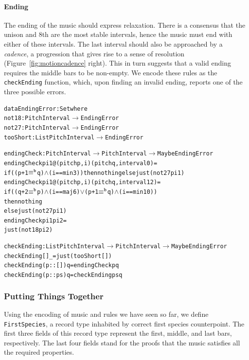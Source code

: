 \paragraph{Ending}

The ending of the music should express relaxation.
There is a consensus that the unison and 8th are the most stable
intervals, hence the music must end with either of these intervals.
The last interval should also be approached by a \emph{cadence},
a progression that gives rise to a sense of resolution
(Figure~\ref{fig:motioncadence} right).
This in turn suggests that a valid ending requires the middle bars
to be non-empty.
We encode these rules as the \texttt{checkEnding} function, which,
upon finding an invalid ending, reports one of the three possible
errors.

\begin{alltt}
data EndingError : Set where
  not18    : PitchInterval      \(\rightarrow\) EndingError
  not27    : PitchInterval      \(\rightarrow\) EndingError
  tooShort : List PitchInterval \(\rightarrow\) EndingError

endingCheck : PitchInterval \(\rightarrow\) PitchInterval \(\rightarrow\) Maybe EndingError
endingCheck pi1@(pitch p , i) (pitch q , interval 0)  = 
  if ((p + 1 \(\equiv\sp{\mathtt{b}}\) q) \(\wedge\) (i == min3)) then nothing else just (not27 pi1)
endingCheck pi1@(pitch p , i) (pitch q , interval 12) =
  if ((q + 2 \(\equiv\sp{\mathtt{b}}\) p) \(\wedge\) (i == maj6) \(\vee\) (p + 1 \(\equiv\sp{\mathtt{b}}\) q) \(\wedge\) (i == min10))
  then nothing
  else just (not27 pi1)
endingCheck pi1               pi2                     =
  just (not18 pi2)

checkEnding : List PitchInterval \(\rightarrow\) PitchInterval \(\rightarrow\) Maybe EndingError
checkEnding []        \_ = just (tooShort [])
checkEnding (p :: []) q = endingCheck p q
checkEnding (p :: ps) q = checkEnding ps q
\end{alltt}

\subsubsection{Putting Things Together}

Using the encoding of music and rules we have seen so far, we define
\texttt{FirstSpecies}, a record type inhabited by correct first species
counterpoint.
The first three fields of this record type represent the first, middle,
and last bars, respectively.
The last four fields stand for the proofs that the music satisfies all
the required properties.

